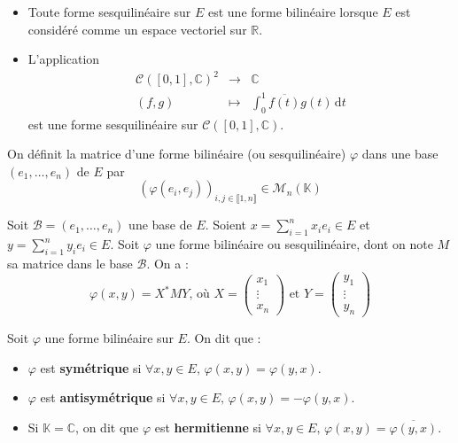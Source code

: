   \begin{example}
    \begin{itemize}
      \item Toute forme sesquilinéaire sur $E$ est une forme bilinéaire lorsque $E$ est considéré comme un espace vectoriel sur $\mathbb{R}$.
      \item L'application
      \[
        \begin{array}{ccc}
          \mathcal{C}([0,1], \mathbb{C})^2 &\rightarrow& \mathbb{C} \\
          (f,g) &\mapsto& \int_0^1 \overline{f(t)} g(t) \, \mathrm{d}t
        \end{array}
      \]
      est une forme sesquilinéaire sur $\mathcal{C}([0,1], \mathbb{C})$.
    \end{itemize}
  \end{example}
  
  \begin{definition}
    On définit la matrice d'une forme bilinéaire (ou sesquilinéaire) $\varphi$ dans une base $(e_1, \dots, e_n)$ de $E$ par
    \[ (\varphi(e_i, e_j))_{i, j \in \llbracket 1, n \rrbracket} \in \mathcal{M}_n(\mathbb{K}) \]
  \end{definition}
  
  \begin{remark}
    Soit $\mathcal{B} = (e_1, \dots, e_n)$ une base de $E$. Soient $x = \sum_{i=1}^{n} x_i e_i \in E$ et $y = \sum_{i=1}^{n} y_i e_i \in E$. Soit $\varphi$ une forme bilinéaire ou sesquilinéaire, dont on note $M$ sa matrice dans le base $\mathcal{B}$. On a :
    \[ \varphi(x,y) = X^* M Y \text{, où } X = \begin{pmatrix} x_1 \\ \vdots \\ x_n \end{pmatrix} \text{ et } Y = \begin{pmatrix} y_1 \\ \vdots \\ y_n \end{pmatrix} \]
  \end{remark}
  
  \begin{definition}
    Soit $\varphi$ une forme bilinéaire sur $E$. On dit que :
    \begin{itemize}
      \item $\varphi$ est \textbf{symétrique} si $\forall x, y \in E, \, \varphi(x,y) = \varphi(y,x)$.
      \item $\varphi$ est \textbf{antisymétrique} si $\forall x, y \in E, \, \varphi(x,y) = -\varphi(y,x)$.
      \item Si $\mathbb{K} = \mathbb{C}$, on dit que $\varphi$ est \textbf{hermitienne} si $\forall x, y \in E, \, \varphi(x,y) = \overline{\varphi(y,x)}$.
    \end{itemize}
  \end{definition}
  
